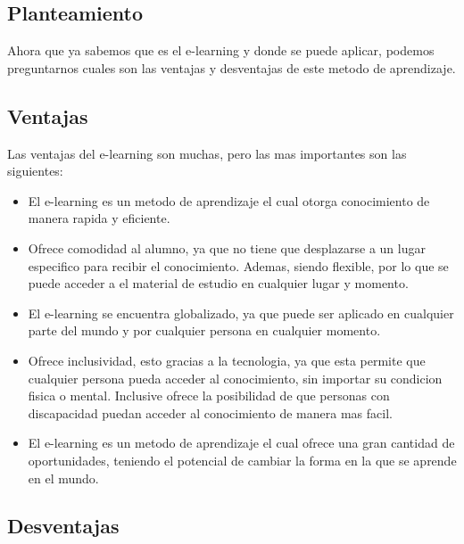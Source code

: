 \subsection{Planteamiento}

Ahora que ya sabemos que es el e-learning y donde se puede aplicar, podemos 
preguntarnos cuales son las ventajas y desventajas de este metodo de 
aprendizaje.

\subsection{Ventajas}

Las ventajas del e-learning son muchas, pero las mas importantes son las 
siguientes: 

\begin{itemize}
    \item El e-learning es un metodo de aprendizaje el cual otorga conocimiento 
        de manera rapida y eficiente.

    \item Ofrece comodidad al alumno, ya que no tiene que desplazarse a un lugar 
        especifico para recibir el conocimiento. Ademas, siendo flexible, por 
        lo que se puede acceder a el material de estudio en cualquier lugar y 
        momento.

    \item El e-learning se encuentra globalizado, ya que puede ser aplicado en 
        cualquier parte del mundo y por cualquier persona en cualquier momento.

    \item Ofrece inclusividad, esto gracias a la tecnologia, ya que esta permite 
        que cualquier persona pueda acceder al conocimiento, sin importar su 
        condicion fisica o mental. Inclusive ofrece la posibilidad de que personas 
        con discapacidad puedan acceder al conocimiento de manera mas facil.

    \item El e-learning es un metodo de aprendizaje el cual ofrece una gran 
        cantidad de oportunidades, teniendo el potencial de cambiar la forma en 
        la que se aprende en el mundo.

\end{itemize}

\subsection{Desventajas}

